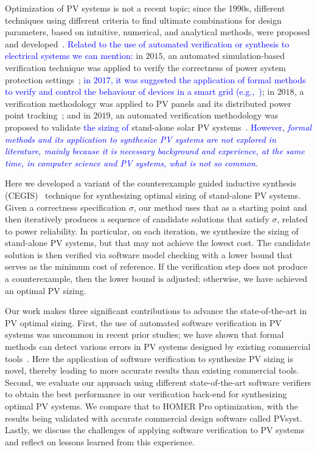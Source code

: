\documentclass[runningheads]{llncs}
\begin{document}
Optimization of PV systems is not a recent topic; since the 1990s, different techniques using different criteria to find ultimate combinations for design parameters, based on intuitive, numerical, and analytical methods, were proposed and developed~\cite{Alsadi2018}. \textcolor{blue}{Related to the use of automated verification or synthesis to electrical systems we can mention:} in $2015$, an automated simulation-based verification technique was applied to verify the correctness of power system protection settings~\cite{Sengupta2015}; \textcolor{blue}{in $2017$, it was suggested the application of formal methods to verify and control the behaviour of devices in a smart grid (e.g.,~\cite{Abate2017})}; in $2018$, a verification methodology was applied to PV panels and its distributed power point tracking~\cite{Driouich2018}; and in $2019$, an automated verification methodology was proposed to validate \textcolor{blue}{the sizing of} stand-alone solar PV systems~\cite{TrindadeCordeiro19}. \textcolor{blue}{However, \textit{formal methods and its application to synthesize PV systems are not explored in literature, mainly because it is necessary background and experience, at the same time, in computer science and PV systems, what is not so common}}.

Here we developed a variant of the counterexample guided inductive synthesis (CEGIS)~\cite{AbateCAV2018} technique for synthesizing optimal sizing of stand-alone PV systems. Given a correctness specification $\sigma$, our method uses that as a starting point and then iteratively produces a sequence of candidate solutions that satisfy $\sigma$, related to power reliability. In particular, on each iteration, we synthesize the sizing of stand-alone PV systems, but that may not achieve the lowest cost. The candidate solution is then verified via software model checking with a lower bound that serves as the minimum cost of reference. If the verification step does not produce a counterexample, then the lower bound is adjusted; otherwise, we have achieved an optimal PV sizing.

Our work makes three significant contributions to advance the state-of-the-art in PV optimal sizing. First, the use of automated software verification in PV systems was uncommon in recent prior studies; we have shown that formal methods can detect various errors in PV systems designed by existing commercial tools~\cite{TrindadeCordeiro19}. Here the application of software verification to synthesize PV sizing is novel, thereby leading to more accurate results than existing commercial tools. Second, we evaluate our approach using different state-of-the-art software verifiers to obtain the best performance in our verification back-end for synthesizing optimal PV systems. We compare that to HOMER Pro optimization, with the results being validated with accurate commercial design software called PVsyst. Lastly, we discuss the challenges of applying software verification to PV systems and reflect on lessons learned from this experience.
\end{document}
